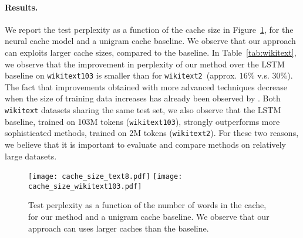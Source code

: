 \documentclass{article} \usepackage{iclr2017_conference,times}
\begin{document}
\paragraph{Results.} We report the test perplexity as a function of the cache size in Figure~\ref{fig:cachesize}, for the neural cache model and a unigram cache baseline.
We observe that our approach can exploits larger cache sizes, compared to the baseline.
In Table~\ref{tab:wikitext}, we observe that the improvement in perplexity of our method over the LSTM baseline on \texttt{wikitext103} is smaller than for \texttt{wikitext2}~(approx. $16\%$ v.s. $30\%$).
The fact that improvements obtained with more advanced techniques decrease when the size of training data increases has already been observed by \citet{goodman2001bit}.
Both \texttt{wikitext} datasets sharing the same test set,  we also observe that the LSTM baseline, trained on 103M tokens (\texttt{wikitext103}), strongly outperforms more sophisticated methods, trained on 2M tokens (\texttt{wikitext2}).
For these two reasons, we believe that it is important to evaluate and compare methods on relatively large datasets.

\begin{figure}
  \centering
  \texttt{[image: cache\_size\_text8.pdf]}
  \hfill
  \texttt{[image: cache\_size\_wikitext103.pdf]}

  \vspace{-0.3cm}
  \caption{Test perplexity as a function of the number of words in the cache, for our method and a unigram cache baseline.
    We observe that our approach can uses larger caches than the baseline.}
  \label{fig:cachesize}
\end{figure}
\end{document}

